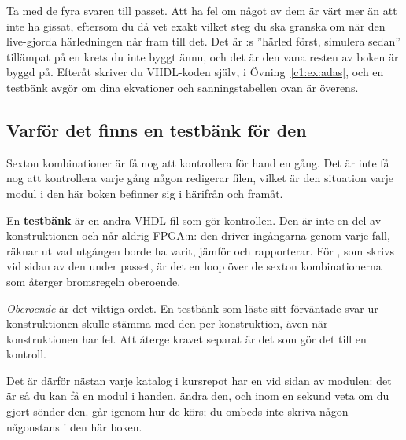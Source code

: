 Ta med de fyra svaren till passet. Att ha fel om något av dem är värt mer än att inte ha gissat,
eftersom du då vet exakt vilket steg du ska granska om när den live-gjorda härledningen når fram
till det. Det är :s ”härled först, simulera sedan” tillämpat på en krets du inte
byggt ännu, och det är den vana resten av boken är byggd på. Efteråt skriver du VHDL-koden själv,
i Övning~\ref{c1:ex:adas}, och en testbänk avgör om dina ekvationer och sanningstabellen ovan är
överens.

\subsection*{Varför det finns en testbänk för den}
Sexton kombinationer är få nog att kontrollera för hand en gång. Det är inte få nog att
kontrollera varje gång någon redigerar filen, vilket är den situation varje modul i den här boken
befinner sig i härifrån och framåt.

En \textbf{testbänk} är en andra VHDL-fil som gör kontrollen. Den är inte en del av
konstruktionen och når aldrig FPGA:n: den driver ingångarna genom varje fall, räknar ut vad
utgången borde ha varit, jämför och rapporterar. För , som skrivs vid sidan av den
under passet, är det en loop över de sexton kombinationerna som återger bromsregeln oberoende.

\emph{Oberoende} är det viktiga ordet. En testbänk som läste sitt förväntade svar ur
konstruktionen skulle stämma med den per konstruktion, även när konstruktionen har fel. Att
återge kravet separat är det som gör det till en kontroll.

Det är därför nästan varje katalog i kursrepot har en  vid sidan av modulen: det är
så du kan få en modul i handen, ändra den, och inom en sekund veta om du gjort sönder den.
 går igenom hur de körs; du ombeds inte skriva någon någonstans i den
här boken.
